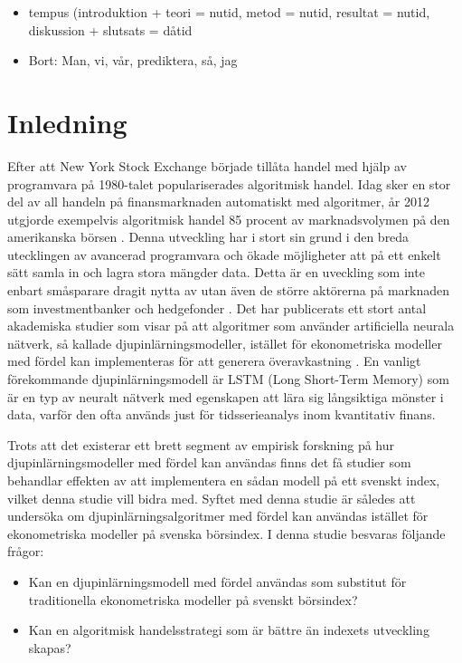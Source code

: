 \documentclass[11pt]{article}
\numberwithin{equation}{section}
\numberwithin{table}{section}
\numberwithin{figure}{section}
\begin{document}
\newpage
\thispagestyle{empty}

\begin{itemize}
    \item tempus (introduktion + teori = nutid, metod = nutid, resultat = nutid,  diskussion + slutsats = dåtid
    \item Bort: Man, vi, vår, prediktera, så, jag
\end{itemize}

\newpage
\clearpage
\setcounter{page}{1}


\section{Inledning}
Efter att New York Stock Exchange började tillåta handel med hjälp av programvara på 1980-talet populariserades algoritmisk handel.  Idag sker en stor del av all handeln på finansmarknaden automatiskt med algoritmer, år 2012 utgjorde exempelvis algoritmisk handel 85 procent av marknadsvolymen på den amerikanska börsen \parencite[][,s.258]{glantz2013multi}. Denna utveckling har i stort sin grund i den breda utecklingen av avancerad programvara och ökade möjligheter att på ett enkelt sätt samla in och lagra stora mängder data. Detta är en uveckling som inte enbart småsparare dragit nytta av utan även de större aktörerna på marknaden som investmentbanker och hedgefonder \parencite{DE_Shaw}. Det har publicerats ett stort antal akademiska studier som visar på att algoritmer som använder artificiella neurala nätverk, så kallade djupinlärningsmodeller, istället för ekonometriska modeller med fördel kan implementeras för att generera överavkastning \parencite{paliwal2009neural}. En vanligt förekommande djupinlärningsmodell är LSTM (Long Short-Term Memory) som är en typ av neuralt nätverk med egenskapen att lära sig långsiktiga mönster i data, varför den ofta används just för tidsserieanalys inom kvantitativ finans.

Trots att det existerar ett brett segment av empirisk forskning på hur djupinlärningsmodeller med fördel kan användas finns det få studier som behandlar effekten av att implementera en sådan modell på ett svenskt index, vilket denna studie vill bidra med. Syftet med denna studie är således att undersöka om djupinlärningsalgoritmer med fördel kan användas istället för ekonometriska modeller på svenska börsindex. I denna studie besvaras följande frågor:

\begin{itemize}
    \item Kan en djupinlärningsmodell med fördel användas som substitut för traditionella ekonometriska modeller på svenskt börsindex?
    \item Kan en algoritmisk handelsstrategi som är bättre än indexets utveckling skapas?
\end{itemize}
\end{document}
